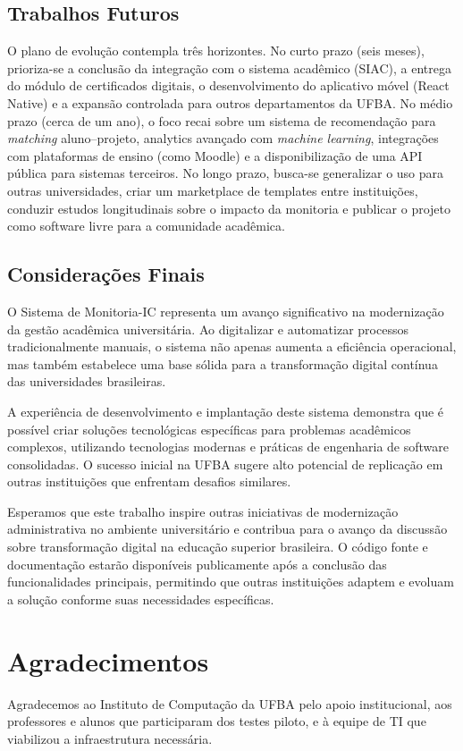 \documentclass[portuguese]{sbc2025}%
\begin{document}
\subsection{Trabalhos Futuros}

O plano de evolução contempla três horizontes. No curto prazo (seis meses), prioriza-se a conclusão da integração com o sistema acadêmico (SIAC), a entrega do módulo de certificados digitais, o desenvolvimento do aplicativo móvel (React Native) e a expansão controlada para outros departamentos da UFBA. No médio prazo (cerca de um ano), o foco recai sobre um sistema de recomendação para \textit{matching} aluno–projeto, analytics avançado com \textit{machine learning}, integrações com plataformas de ensino (como Moodle) e a disponibilização de uma API pública para sistemas terceiros. No longo prazo, busca-se generalizar o uso para outras universidades, criar um marketplace de templates entre instituições, conduzir estudos longitudinais sobre o impacto da monitoria e publicar o projeto como software livre para a comunidade acadêmica.

\subsection{Considerações Finais}

O Sistema de Monitoria-IC representa um avanço significativo na modernização da gestão acadêmica universitária. Ao digitalizar e automatizar processos tradicionalmente manuais, o sistema não apenas aumenta a eficiência operacional, mas também estabelece uma base sólida para a transformação digital contínua das universidades brasileiras.

A experiência de desenvolvimento e implantação deste sistema demonstra que é possível criar soluções tecnológicas específicas para problemas acadêmicos complexos, utilizando tecnologias modernas e práticas de engenharia de software consolidadas. O sucesso inicial na UFBA sugere alto potencial de replicação em outras instituições que enfrentam desafios similares.

Esperamos que este trabalho inspire outras iniciativas de modernização administrativa no ambiente universitário e contribua para o avanço da discussão sobre transformação digital na educação superior brasileira. O código fonte e documentação estarão disponíveis publicamente após a conclusão das funcionalidades principais, permitindo que outras instituições adaptem e evoluam a solução conforme suas necessidades específicas.

\section*{Agradecimentos}

Agradecemos ao Instituto de Computação da UFBA pelo apoio institucional, aos professores e alunos que participaram dos testes piloto, e à equipe de TI que viabilizou a infraestrutura necessária.



\end{document}
